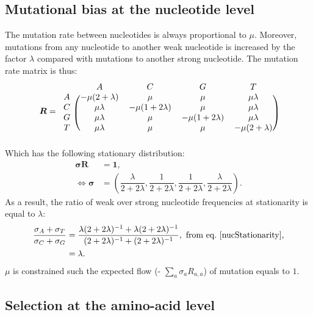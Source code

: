 \documentclass{article}
\newcommand{\UniDimArray}[1]{\bm{#1}}
\newcommand{\BiDimArray}[1]{\bm{#1}}
\newcommand{\vecOne}{\UniDimArray{1}}
\newcommand{\mutmatrix}{R}
\newcommand{\Mutmatrix}{\BiDimArray{\mutmatrix}}
\newcommand{\mutequi}{\sigma}
\newcommand{\Mutequi}{\UniDimArray{\mutequi}}
\begin{document}
\subsection{Mutational bias at the nucleotide level}
\label{sec:mut-bias-mut-matrix}
The mutation rate between nucleotides is always proportional to $\mu$.
Moreover, mutations from any nucleotide to another weak nucleotide is increased by the factor $\lambda$ compared with mutations to another strong nucleotide.
The mutation rate matrix is thus:
\begin{equation}
 \label{nucMatrix}
 \Mutmatrix =
 \begin{blockarray}{ccccc}
 & A & C & G & T \\
 \begin{block}{c(cccc)}
 A & {-\mu(2 + \lambda)} & {\mu} & {\mu} & {\mu \lambda} \\
 C & {\mu \lambda} & {-\mu(1 + 2\lambda)} & {\mu} & {\mu \lambda} \\
 G & {\mu \lambda} & {\mu} & {-\mu(1 + 2\lambda)} & {\mu \lambda} \\
 T & {\mu \lambda} & {\mu} & {\mu} & {-\mu(2 + \lambda)} \\
 \end{block}
 \end{blockarray}
\end{equation}
Which has the following stationary distribution:
\begin{align}
 \Mutequi \Mutmatrix & = \vecOne, \\
 \iff \Mutequi & = \left( \dfrac{\lambda}{2+2\lambda}, \dfrac{1}{2+2\lambda}, \dfrac{1}{2+2\lambda}, \dfrac{\lambda}{2+2\lambda} \right).
 \label{nucStationarity}
\end{align}
As a result, the ratio of weak over strong nucleotide frequencies at stationarity is equal to $\lambda$:
\begin{align}
 \label{lambda}
 \dfrac{ \mutequi_A + \mutequi_T }{ \mutequi_C + \mutequi_G }
 & = \dfrac{ \lambda ( 2 + 2 \lambda)^{-1} + \lambda ( 2 + 2 \lambda)^{-1}}{ ( 2 + 2 \lambda)^{-1} + ( 2 + 2 \lambda)^{-1}}, \ \text{from eq.~\ref{nucStationarity},}\\
 & = \lambda.
\end{align}
$\mu$ is constrained such the expected flow (- $\sum_{a} \mutequi_a \mutmatrix_{a, a} $) of mutation equals to $1$.

\subsection{Selection at the amino-acid level}
\label{sec:mut-bias-aa-selection}
\end{document}
